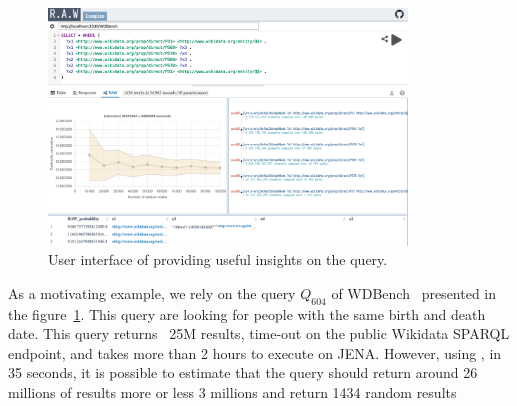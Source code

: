 
 \begin{figure}
   \centering
   \includegraphics[width=0.85\textwidth]{figures/raw_screenshot.png}
   \caption{\label{fig:raw_screenshot}User interface of \NAME providing useful insights on the query.}
 \end{figure}


 As a motivating example, we rely on the query $Q_{604}$ of
 WDBench~\cite{angles2022wdbench} presented in the
 figure~\ref{fig:raw_screenshot}. This query are looking for people
 with the same birth and death date. This query returns ~25M results,
 time-out on the public Wikidata SPARQL endpoint, and takes more than
 2 hours to execute on JENA. However, using \NAME, in 35 seconds, it
 is possible to estimate that the query should return around 26
 millions of results more or less 3 millions and return 1434 random
 results


